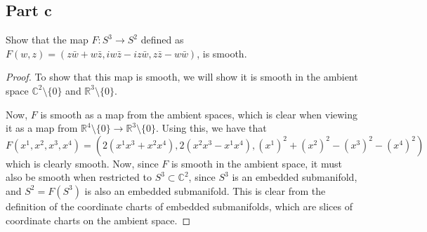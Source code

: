\documentclass[fontsize=11pt]{scrartcl} %
\numberwithin{equation}{section} %
\numberwithin{figure}{section} %
\numberwithin{table}{section} %
\newcommand{\R}{\mathbb{R}}
\newcommand{\C}{\mathbb{C}}
\begin{document}
\subsection*{Part c}
Show that the map $F:S^3\to S^2$ defined as $F(w,z) = (z\bar{w} + w\bar{z}, iw\bar{z} - iz\bar{w}, z\bar{z} - w\bar{w})$,
is smooth.
\\
\begin{proof}
To show that this map is smooth, we will show it is smooth in the ambient space $\C^2\setminus\{0\}$
and $\R^3\setminus\{0\}$. 

Now, $F$ is smooth as a map from the ambient spaces, which is clear when viewing it as a
map from $\R^4\setminus\{0\}\to\R^3\setminus\{0\}$. Using this, we have that
\[
F(x^1,x^2,x^3,x^4) = (2(x^1x^3 + x^2x^4),2(x^2x^3 - x^1x^4), (x^1)^2 + (x^2)^2 - (x^3)^2 - (x^4)^2)
\] 
which is clearly smooth. Now, since $F$ is smooth in the ambient space, it must also be smooth
when restricted to $S^3\subset \C^2$, since $S^3$ is an embedded submanifold, and $S^2=F(S^3)$
is also an embedded submanifold. This is clear from the definition of the coordinate charts
of embedded submanifolds, which are slices of coordinate charts on the ambient space.
\end{proof}
\pagebreak
\end{document}
